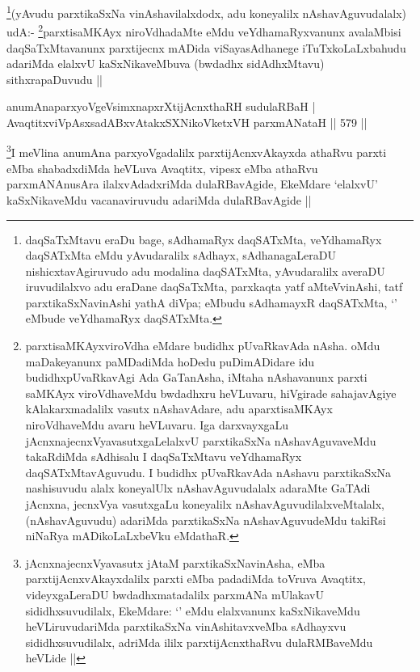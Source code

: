 \begin{artha}
\footnote{daqSaTxMtavu eraDu bage, sAdhamaRyx daqSATxMta, veYdhamaRyx daqSATxMta eMdu yAvudaralilx sAdhayx, sAdhanagaLeraDU nishicxtavAgiruvudo adu modalina daqSATxMta, yAvudaralilx averaDU iruvudilalxvo adu eraDane daqSaTxMta, parxkaqta yatf aMteVvinAshi, tatf parxtikaSxNavinAshi yathA diVpa; eMbudu sAdhamayxR daqSATxMta, `\stext' eMbude veYdhamaRyx daqSATxMta.}(yAvudu parxtikaSxNa vinAshavilalxdodx, adu koneyalilx nAshavAguvudalalx) udA:- \footnote{parxtisaMKAyxviroVdha eMdare budidhx pUvaRkavAda nAsha. oMdu maDakeyanunx paMDadiMda hoDedu puDimADidare idu budidhxpUvaRkavAgi Ada GaTanAsha, iMtaha nAshavanunx parxti saMKAyx viroVdhaveMdu bwdadhxru heVLuvaru, hiVgirade sahajavAgiye kAlakarxmadalilx vasutx nAshavAdare, adu aparxtisaMKAyx niroVdhaveMdu avaru heVLuvaru. Iga darxvayxgaLu jAcnxnajecnxVyavasutxgaLelalxvU parxtikaSxNa nAshavAguvaveMdu takaRdiMda sAdhisalu I daqSaTxMtavu veYdhamaRyx daqSATxMtavAguvudu. I budidhx pUvaRkavAda nAshavu parxtikaSxNa nashisuvudu alalx koneyalUlx nAshavAguvudalalx adaraMte GaTAdi jAcnxna, jecnxVya vasutxgaLu koneyalilx nAshavAguvudilalxveMtalalx, (nAshavAguvudu) adariMda parxtikaSxNa nAshavAguvudeMdu takiRsi niNaRya mADikoLaLxbeVku eMdathaR.}parxtisaMKAyx niroVdhadaMte eMdu veYdhamaRyxvanunx avalaMbisi daqSaTxMtavanunx parxtijecnx mADida viSayasAdhanege iTuTxkoLaLxbahudu adariMda elalxvU kaSxNikaveMbuva (bwdadhx sidAdhxMtavu) sithxrapaDuvudu ||
\end{artha}

\begin{shl}
anumAnaparxyoVgeV\s simxnapxrXtijAcnxthaRH sudulaRBaH | \\
AvaqtitxviVpAsxsadABxvAtakxSXNikoVketxVH parxmANataH \hfill||  579 ||  
\end{shl}

\begin{artha}
\footnote{jAcnxnajecnxVyavasutx jAtaM parxtikaSxNavinAsha, eMba parxtijAcnxvAkayxdalilx parxti eMba padadiMda toVruva Avaqtitx, videyxgaLeraDU bwdadhxmatadalilx parxmANa mUlakavU sididhxsuvudilalx, EkeMdare: `\stext' eMdu elalxvanunx kaSxNikaveMdu heVLiruvudariMda parxtikaSxNa vinAshitavxveMba sAdhayxvu sididhxsuvudilalx, adriMda ililx parxtijAcnxthaRvu dulaRMBaveMdu heVLide ||}I meVlina anumAna parxyoVgadalilx parxtijAcnxvAkayxda athaRvu parxti eMba shabadxdiMda heVLuva Avaqtitx, vipesx eMba athaRvu parxmANAnusAra ilalxvAdadxriMda dulaRBavAgide, EkeMdare `elalxvU' kaSxNikaveMdu vacanaviruvudu adariMda dulaRBavAgide ||
\end{artha}

